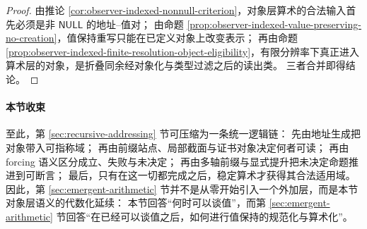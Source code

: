 \begin{proof}
由推论 \ref{cor:observer-indexed-nonnull-criterion}，对象层算术的合法输入首先必须是非 \(\mathsf{NULL}\) 的地址--值对；
由命题 \ref{prop:observer-indexed-value-preserving-no-creation}，值保持重写只能在已定义对象上改变表示；
再由命题 \ref{prop:observer-indexed-finite-resolution-object-eligibility}，有限分辨率下真正进入算术层的对象，是折叠同余经对象化与类型过滤之后的读出类。
三者合并即得结论。
\end{proof}

\paragraph{本节收束}
至此，第 \ref{sec:recursive-addressing} 节可压缩为一条统一逻辑链：
先由地址生成把对象带入可指称域；
再由前缀站点、局部截面与证书对象决定何者可读；
再由 forcing 语义区分成立、失败与未决定；
再由多轴前缀与显式提升把未决定命题推进到可断言；
最后，只有在这一切都完成之后，稳定算术才获得其合法适用域。
因此，第 \ref{sec:emergent-arithmetic} 节并不是从零开始引入一个外加层，而是本节对象层语义的代数化延续：
本节回答“何时可以谈值”，而第 \ref{sec:emergent-arithmetic} 节回答“在已经可以谈值之后，如何进行值保持的规范化与算术化”。
